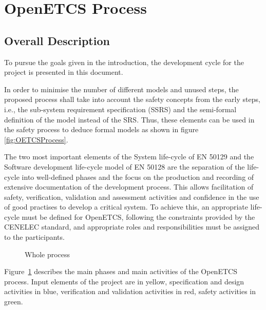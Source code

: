 
\section{OpenETCS Process}


\subsection{Overall Description}
\label{sec:overall_description}


To pursue the goals given in the introduction, the development cycle for the project is presented in this document.

In order to minimise the number of different models and unused steps, the proposed process shall take into account the safety concepts from the early steps, i.e., the sub-system requirement specification (SSRS) and the semi-formal definition of the model instead of the SRS. Thus, these elements can be used in the safety process to deduce formal models as shown in figure \ref{fig:OETCSProcess}.

The two most important elements of the System life-cycle of EN 50129 and the Software development life-cycle model of EN
50128 are the separation of the life-cycle into well-defined
phases and the focus on the production and recording of extensive documentation of the
development process. This allows facilitation of safety, verification, validation and assessment activities and confidence in the use of good practises to develop a critical system. To achieve this, an appropriate life-cycle
must be defined for OpenETCS, following the constraints provided by the CENELEC standard, and appropriate roles and responsibilities must be assigned to the participants.

 \begin{figure}
  \centering
  \caption{Whole process}
  \label{fig:whole_process}
\end{figure}

Figure~\ref{fig:whole_process} describes the main phases and main activities of the OpenETCS process.
Input elements of the project are in yellow, specification and design activities in blue, verification and validation activities in red, safety activities in green.

